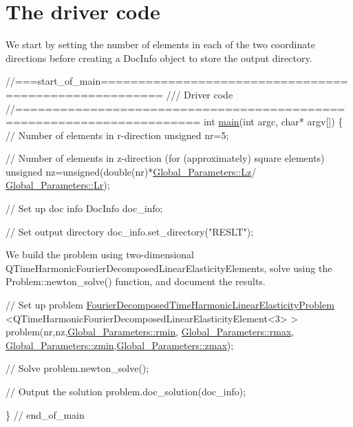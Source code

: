  

\hypertarget{index_main}{}\section{The driver code}\label{index_main}
We start by setting the number of elements in each of the two coordinate directions before creating a {\ttfamily Doc\+Info} object to store the output directory.


\begin{DoxyCodeInclude}
\textcolor{comment}{//===start\_of\_main======================================================}
\textcolor{comment}{/// Driver code }
\textcolor{comment}{}\textcolor{comment}{//======================================================================}
\textcolor{keywordtype}{int} \hyperlink{cylinder_8cc_a0ddf1224851353fc92bfbff6f499fa97}{main}(\textcolor{keywordtype}{int} argc, \textcolor{keywordtype}{char}* argv[]) 
\{
 \textcolor{comment}{// Number of elements in r-direction}
 \textcolor{keywordtype}{unsigned} nr=5;
 
 \textcolor{comment}{// Number of elements in z-direction (for (approximately) square elements)}
 \textcolor{keywordtype}{unsigned} nz=unsigned(\textcolor{keywordtype}{double}(nr)*\hyperlink{namespaceGlobal__Parameters_a2bcf0bd846d839f1e3bb04a6c0a612c1}{Global\_Parameters::Lz}/
      \hyperlink{namespaceGlobal__Parameters_a444f5c911c8805ad2ba45ed8b1b8904e}{Global\_Parameters::Lr});

 \textcolor{comment}{// Set up doc info}
 DocInfo doc\_info;
 
 \textcolor{comment}{// Set output directory}
 doc\_info.set\_directory(\textcolor{stringliteral}{"RESLT"});

\end{DoxyCodeInclude}


We build the problem using two-\/dimensional {\ttfamily Q\+Time\+Harmonic\+Fourier\+Decomposed\+Linear\+Elasticity\+Elements}, solve using the {\ttfamily Problem\+::newton\+\_\+solve()} function, and document the results.


\begin{DoxyCodeInclude}
 \textcolor{comment}{// Set up problem}
 \hyperlink{classFourierDecomposedTimeHarmonicLinearElasticityProblem}{FourierDecomposedTimeHarmonicLinearElasticityProblem}
  <QTimeHarmonicFourierDecomposedLinearElasticityElement<3> > 
  problem(nr,nz,\hyperlink{namespaceGlobal__Parameters_ad454d80ae621f272dd1d7932249545a5}{Global\_Parameters::rmin},
      \hyperlink{namespaceGlobal__Parameters_a5d7fb394c980bb4bf2a52158f9d7cc50}{Global\_Parameters::rmax},
          \hyperlink{namespaceGlobal__Parameters_ac6a17dbcf1b8f1136a1ec5c07efef708}{Global\_Parameters::zmin},\hyperlink{namespaceGlobal__Parameters_a8ee2afb91b9b105939f19a0efa8e1441}{Global\_Parameters::zmax});
 
 \textcolor{comment}{// Solve}
 problem.newton\_solve();
 
 \textcolor{comment}{// Output the solution}
 problem.doc\_solution(doc\_info);
  
\} \textcolor{comment}{// end\_of\_main}

\end{DoxyCodeInclude}




